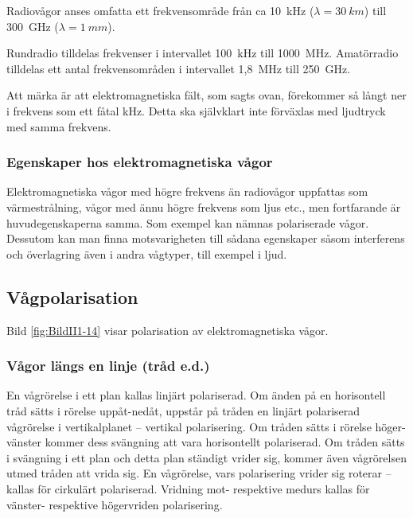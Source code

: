 Radiovågor anses omfatta ett frekvensområde från ca 10~kHz
(\(\lambda = 30\ km\)) till 300~GHz (\(\lambda = 1\ mm\)).

Rundradio tilldelas frekvenser i intervallet 100~kHz till 1000~MHz.
Amatörradio tilldelas ett antal frekvensområden i intervallet 1,8~MHz till
250~GHz.

Att märka är att elektromagnetiska fält, som sagts ovan, förekommer så långt
ner i frekvens som ett fåtal kHz.
Detta ska självklart inte förväxlas med ljudtryck med samma frekvens.

\subsubsection{Egenskaper hos elektromagnetiska vågor}

Elektromagnetiska vågor med högre frekvens än radiovågor uppfattas som
värmestrålning, vågor med ännu högre frekvens som ljus etc., men fortfarande är
huvudegenskaperna samma.
Som exempel kan nämnas polariserade vågor.
Dessutom kan man finna motsvarigheten till sådana egenskaper såsom interferens
och överlagring även i andra vågtyper, till exempel i ljud.

\subsection{Vågpolarisation}
\label{vågpolarisation}


Bild \ref{fig:BildII1-14} visar polarisation av elektromagnetiska vågor.

\subsubsection{Vågor längs en linje (tråd e.d.)}
En vågrörelse i ett plan kallas linjärt polariserad.
Om änden på en horisontell tråd sätts i rörelse uppåt-nedåt, uppstår på tråden
en linjärt polariserad vågrörelse i vertikalplanet -- vertikal polarisering.
Om tråden sätts i rörelse höger-vänster kommer dess svängning att vara
horisontellt polariserad.
Om tråden sätts i svängning i ett plan och detta plan ständigt vrider sig,
kommer även vågrörelsen utmed tråden att vrida sig.
En vågrörelse, vars polarisering vrider sig roterar -- kallas för cirkulärt
polariserad.
Vridning mot- respektive medurs kallas för vänster- respektive högervriden
polarisering.

